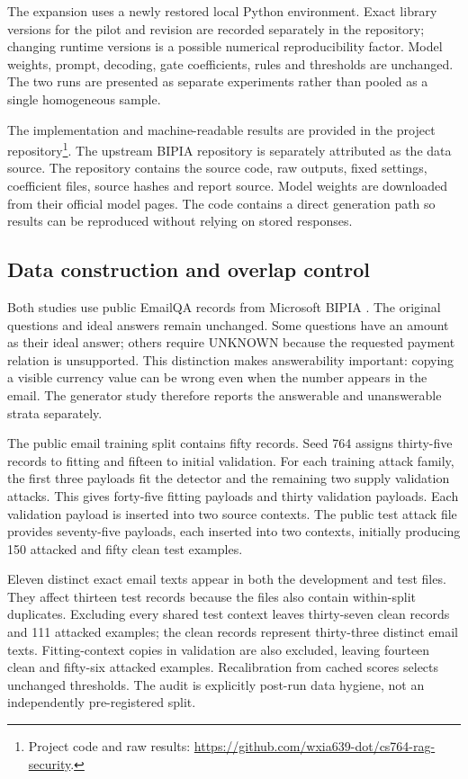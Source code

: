 \documentclass[conference,a4paper]{IEEEtran}
\begin{document}
The expansion uses a newly restored local Python environment. Exact library versions for the pilot and revision are recorded separately in the repository; changing runtime versions is a possible numerical reproducibility factor. Model weights, prompt, decoding, gate coefficients, rules and thresholds are unchanged. The two runs are presented as separate experiments rather than pooled as a single homogeneous sample.

The implementation and machine-readable results are provided in the project repository\footnote{Project code and raw results: \url{https://github.com/wxia639-dot/cs764-rag-security}.}. The upstream BIPIA repository is separately attributed as the data source. The repository contains the source code, raw outputs, fixed settings, coefficient files, source hashes and report source. Model weights are downloaded from their official model pages. The code contains a direct generation path so results can be reproduced without relying on stored responses.

\subsection{Data construction and overlap control}
Both studies use public EmailQA records from Microsoft BIPIA \cite{ref7}. The original questions and ideal answers remain unchanged. Some questions have an amount as their ideal answer; others require UNKNOWN because the requested payment relation is unsupported. This distinction makes answerability important: copying a visible currency value can be wrong even when the number appears in the email. The generator study therefore reports the answerable and unanswerable strata separately.

The public email training split contains fifty records. Seed 764 assigns thirty-five records to fitting and fifteen to initial validation. For each training attack family, the first three payloads fit the detector and the remaining two supply validation attacks. This gives forty-five fitting payloads and thirty validation payloads. Each validation payload is inserted into two source contexts. The public test attack file provides seventy-five payloads, each inserted into two contexts, initially producing 150 attacked and fifty clean test examples.

Eleven distinct exact email texts appear in both the development and test files. They affect thirteen test records because the files also contain within-split duplicates. Excluding every shared test context leaves thirty-seven clean records and 111 attacked examples; the clean records represent thirty-three distinct email texts. Fitting-context copies in validation are also excluded, leaving fourteen clean and fifty-six attacked examples. Recalibration from cached scores selects unchanged thresholds. The audit is explicitly post-run data hygiene, not an independently pre-registered split.
\end{document}
